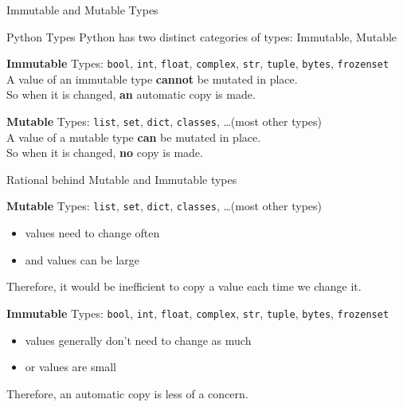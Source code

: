 \documentclass[10pt, colorlinks=true, urlcolor=blue]{beamer}
\begin{document}
\begin{frame}{Immutable and Mutable Types}
  \begin{block}{Python Types}
    Python has two distinct categories of types: Immutable, Mutable
  \end{block}
  
  \vspace{2.4em}
  
  \textbf{Immutable} Types: \texttt{bool}, \texttt{int}, \texttt{float}, \texttt{complex}, \texttt{str}, \texttt{tuple}, \texttt{bytes}, \texttt{frozenset} \\
  
  \vspace{-0.8em}
  A value of an immutable type \textbf{cannot} be mutated in place. \\
  So when it is changed, \textbf{an} automatic copy is made. \\
  
  \vspace{2.0em}
  
  \textbf{Mutable} Types: \texttt{list}, \texttt{set}, \texttt{dict}, \texttt{classes}, \dots (most other types) \\
  
  \vspace{-0.8em}
  A value of a mutable type \textbf{can} be mutated in place. \\
  So when it is changed, \textbf{no} copy is made.
\end{frame}

\begin{frame}{Rational behind Mutable and Immutable types}
 
  \textbf{Mutable} Types: \texttt{list}, \texttt{set}, \texttt{dict}, \texttt{classes}, \dots (most other types)
  \begin{itemize}
  \item values need to change often
  \item and values can be large
  \end{itemize}
  Therefore, it would be inefficient to copy a value each time we change it.
  
  \vspace{3em}
  
  \textbf{Immutable} Types: \texttt{bool}, \texttt{int}, \texttt{float}, \texttt{complex}, \texttt{str}, \texttt{tuple}, \texttt{bytes}, \texttt{frozenset}
  \begin{itemize}
  \item values generally don't need to change as much
  \item or values are small
  \end{itemize}
  Therefore, an automatic copy is less of a concern.

  \vspace{2em}
  
\end{frame}
\end{document}
